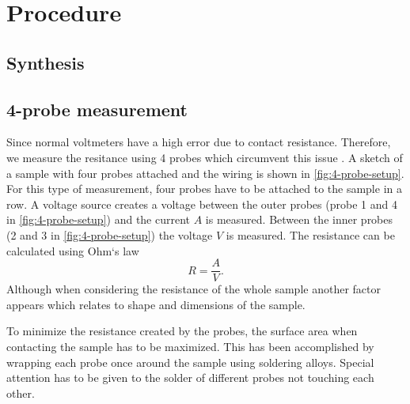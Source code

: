 \section{Procedure}
\label{sec:procedure}

\subsection{Synthesis}
\label{sec:synthesis}

\subsection{4-probe measurement}
\label{sec:4-probe measurement}
Since normal voltmeters have a high error due to contact resistance. Therefore, we measure the
resitance using 4 probes which circumvent this issue
\cite{Hofmann_2009,https://doi.org/10.1002/j.1538-7305.1958.tb03883.x}. A sketch of a sample with
four probes attached and the wiring is shown in \autoref{fig:4-probe-setup}. For this type of
measurement, four probes have to be attached to the sample in a row. A voltage source creates a
voltage between the outer probes (probe 1 and 4 in \autoref{fig:4-probe-setup}) and the current $A$ is
measured. Between the inner probes (2 and 3 in \autoref{fig:4-probe-setup}) the voltage $V$ is measured.
The resistance can be calculated using Ohm`s law
\begin{equation}
  R = \frac{A}{V}.
\end{equation}
Although when considering the resistance of the whole sample another factor appears which relates to
shape and dimensions of the sample.

To minimize the resistance created by the probes, the surface area when contacting the sample has to be
maximized. This has been accomplished by wrapping each probe once around the sample using
soldering alloys. Special attention has to be given to the solder of different probes not touching each
other.

